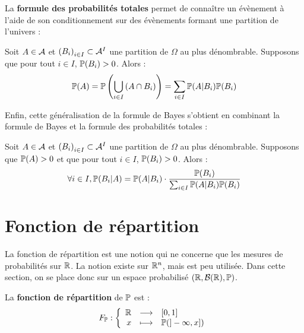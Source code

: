 \documentclass[../integ-proba.tex]{subfiles}
\begin{document}
    La \textbf{formule des probabilités totales} permet de connaître un évènement à l'aide de son conditionnement sur des évènements formant une partition de l'univers :

    \begin{thm}
        Soit $A \in \mathcal{A}$ et $\left( B_i \right)_{i \in I} \subset \mathcal{A}^I$ une partition de $\Omega$ au plus dénombrable.
        Supposons que pour tout $i \in I$, $\mathbb{P}(B_i) > 0$.
        Alors :
        \begin{displaymath}
            \mathbb{P}(A) = \mathbb{P}\left(\bigcup_{i \in I} \left(A \cap B_i \right)\right) = \sum_{i \in I} \mathbb{P}(A | B_i) \mathbb{P}(B_i)
        \end{displaymath}
    \end{thm}

    Enfin, cette généralisation de la formule de Bayes s'obtient en combinant la formule de Bayes et la formule des probabilités totales :

    \begin{thm}
        Soit $A \in \mathcal{A}$ et $\left( B_i \right)_{i \in I} \subset \mathcal{A}^I$ une partition de $\Omega$ au plus dénombrable.
        Supposons que $\mathbb{P}(A) > 0$ et que pour tout $i \in I$, $\mathbb{P}(B_i) > 0$.
        Alors :
        \begin{displaymath}
            \forall i \in I, \mathbb{P}(B_i | A) = \mathbb{P}(A | B_i) \cdot \frac{\mathbb{P}(B_i)}{\sum_{i \in I} \mathbb{P}(A | B_i) \mathbb{P}(B_i)}
        \end{displaymath}
    \end{thm}

    \section{Fonction de répartition}

    La fonction de répartition est une notion qui ne concerne que les mesures de probabilités sur $\mathbb{R}$.
    La notion existe sur $\mathbb{R}^n$, mais est peu utilisée.
    Dans cette section, on se place donc sur un espace probabilisé $\left( \mathbb{R}, \mathcal{B}(\mathbb{R}), \mathbb{P} \right)$.

    \begin{defi}
        La \textbf{fonction de répartition} de $\mathbb{P}$ est :
        \begin{displaymath}
            F_{\mathbb{P}}:
            \left\{
            \begin{array}{rcl}
                \mathbb{R} & \longrightarrow & [0,1] \\
                x          & \longmapsto     & \mathbb{P}(]- \infty, x])
            \end{array}
            \right.
        \end{displaymath}
    \end{defi}
\end{document}
